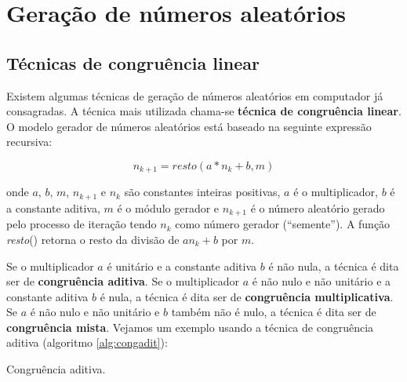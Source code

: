 \documentclass[a4paper,12pt,oneside,onecolumn]{uerj/uerj}
\begin{document}
\chapter{Geração de números aleatórios}

\section{Técnicas de congruência linear}

Existem algumas técnicas de geração de números aleatórios em computador já consagradas. A técnica mais utilizada chama-se \textbf{técnica de congruência linear}. O modelo gerador de números aleatórios está baseado na seguinte expressão recursiva:

\begin{equation}
n_{k+1} = resto(a*n_{k} + b,m)
\end{equation}

\noindent onde $a$, $b$, $m$, $n_{k+1}$ e $n_{k}$ são constantes inteiras positivas, $a$ é o multiplicador, $b$ é a constante aditiva, $m$ é o módulo gerador e $n_{k+1}$ é o número aleatório gerado pelo processo de iteração tendo $n_k$ como número gerador (``semente''). A função \emph{resto}() retorna o resto da divisão de $an_{k} + b$ por $m$.

Se o multiplicador $a$ é unitário e a constante aditiva $b$ é não nula, a técnica é dita ser de \textbf{congruência aditiva}. Se o multiplicador $a$ é não nulo e não unitário e a constante aditiva $b$ é nula, a técnica é dita ser de \textbf{congruência multiplicativa}. Se $a$ é não nulo e não unitário e $b$ também não é nulo, a técnica é dita ser de \textbf{congruência mista}. Vejamos um exemplo usando a técnica de congruência aditiva (algoritmo \ref{alg:congadit}):

\begin{algorithm}[!ht]
    \caption{Congruência aditiva.} \label{alg:congadit}
    \begin{pseudocode}
      \Documentacao
        \Algoritmo{}
          \FimPara
        \FimAlgoritmo
      \FimDocumentacao
    \end{pseudocode}
\end{algorithm}
\end{document}
